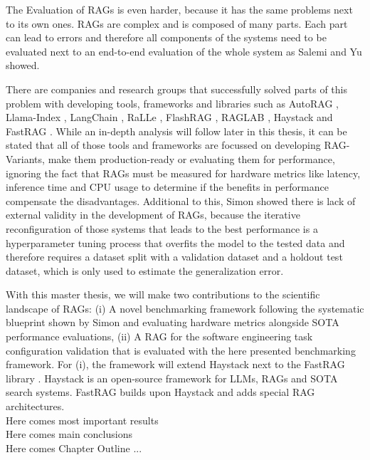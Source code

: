 The Evaluation of RAGs is even harder, because it has the same problems next to its own ones. RAGs are complex and is composed of many parts. Each part can lead to errors and therefore all components of the systems need to be evaluated next to an end-to-end evaluation of the whole system as Salemi \cite{Salemi.2024} and Yu \cite{Yu.2024} showed.

There are companies and research groups that successfully solved parts of this problem with developing tools, frameworks and libraries such as AutoRAG \cite{AutoRAG}, Llama-Index \cite{Liu_LlamaIndex_2022}, LangChain \cite{Chase_LangChain_2022}, RaLLe \cite{ralle}, FlashRAG \cite{FlashRAG}, RAGLAB \cite{zhang-etal-2024-raglab}, Haystack \cite{Pietsch_Haystack_the_end-to-end_2019} and FastRAG \cite{Izsak_fastRAG_Efficient_Retrieval_2023}. While an in-depth analysis will follow later in this thesis, it can be stated that all of those tools and frameworks are focussed on developing RAG-Variants, make them production-ready or evaluating them for performance, ignoring the fact that RAGs must be measured for hardware metrics like latency, inference time and CPU usage to determine if the benefits in performance compensate the disadvantages. Additional to this, Simon \cite{Simon.10112024} showed there is lack of external validity in the development of RAGs, because the iterative reconfiguration of those systems that leads to the best performance is a hyperparameter tuning process that overfits the model to the tested data and therefore requires a dataset split with a validation dataset and a holdout test dataset, which is only used to estimate the generalization error.

With this master thesis, we will make two contributions to the scientific landscape of RAGs: (i) A novel benchmarking framework following the systematic blueprint shown by Simon \cite{Simon.10112024} and evaluating hardware metrics alongside SOTA performance evaluations, (ii) A RAG for the software engineering task configuration validation that is evaluated with the here presented benchmarking framework. For (i), the framework will extend Haystack \cite{Pietsch_Haystack_the_end-to-end_2019} next to the FastRAG library \cite{Izsak_fastRAG_Efficient_Retrieval_2023}. Haystack is an open-source framework for LLMs, RAGs and SOTA search systems. FastRAG builds upon Haystack and adds special RAG architectures. \\


\large Here comes most important results \\
\large Here comes main conclusions \\
\large Here comes Chapter Outline ...\\
